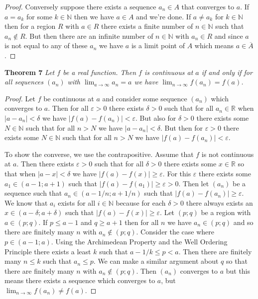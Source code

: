 \documentclass{article}
\begin{document}
\begin{flushleft}
\begin{proof}
Conversely suppose there exists a sequence $a_n \in A$ that converges to $a$. If $a=a_k$ for some $k \in \mathbb{N}$ then we have $a \in A$ and we're done. If $a \neq a_k$ for $k \in \mathbb{N}$ then for a region $R$ with $a \in R$ there exists a finite number of $n \in \mathbb{N}$ such that $a_n \notin R$. But then there are an infinite number of $n \in \mathbb{N}$ with $a_n \in R$ and since $a$ is not equal to any of these $a_n$ we have $a$ is a limit point of $A$ which means $a \in \overline{A}$.
\end{proof}

\textbf{Theorem 7}
\textsl{Let $f$ be a real function. Then $f$ is continuous at $a$ if and only if for all sequences $(a_n)$ with $\lim_{a \rightarrow \infty} a_n = a$ we have $\lim_{n \rightarrow \infty} f(a_n) = f(a)$.}
\begin{proof}
Let $f$ be continuous at $a$ and consider some sequence $(a_n)$ which converges to $a$. Then for all $\varepsilon > 0$ there exists $\delta > 0$ such that for all $a_n \in \mathbb{R}$ when $|a-a_n| < \delta$ we have $|f(a) - f(a_n)| < \varepsilon$. But also for $\delta > 0$ there exists some $N \in \mathbb{N}$ such that for all $n > N$ we have $|a-a_n| < \delta$. But then for $\varepsilon > 0$ there exists some $N \in \mathbb{N}$ such that for all $n>N$ we have $|f(a) - f(a_n)| < \varepsilon$.\newline

To show the converse, we use the contrapositive. Assume that $f$ is not continuous at $a$. Then there exists $\varepsilon > 0$ such that for all $\delta > 0$ there exists some $x \in \mathbb{R}$ so that when $|a - x| < \delta$ we have $|f(a) - f(x)| \geq \varepsilon$. For this $\varepsilon$ there exists some $a_1 \in (a - 1 ; a + 1)$ such that $|f(a) - f(a_1)| \geq \varepsilon > 0$. Then let $(a_n)$ be a sequence such that $a_n \in (a - 1/n ; a + 1/n)$ such that $|f(a) - f(a_n)| \geq \varepsilon$. We know that $a_i$ exists for all $i \in \mathbb{N}$ because for each $\delta > 0$ there always exists an $x \in (a - \delta ; a + \delta)$ such that $|f(a) - f(x)| \geq \varepsilon$. Let $(p;q)$ be a region with $a \in (p;q)$. If $p \leq a - 1$ and $q \geq a + 1$ then for all $n$ we have $a_n \in (p;q)$ and so there are finitely many $n$ with $a_n \notin (p;q)$. Consider the case where $p \in (a-1;a)$. Using the Archimedean Property and the Well Ordering Principle there exists a least $k$ such that $a-1/k \leq p < a$. Then there are finitely many $n \leq k$ such that $a_n \leq p$. We can make a similar argument about $q$ so that there are finitely many $n$ with $a_n \notin (p;q)$. Then $(a_n)$ converges to $a$ but this means there exists a sequence which converges to $a$, but $\lim_{n \rightarrow \infty} f(a_n) \neq f(a)$.
\end{proof}


\end{flushleft}
\end{document}
